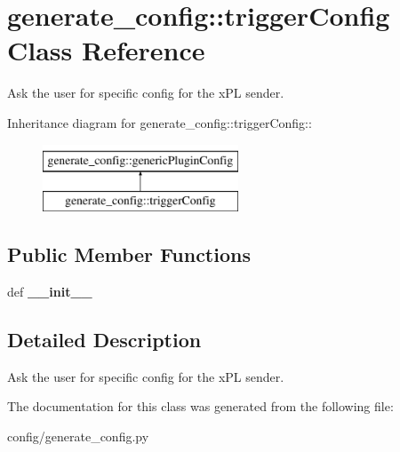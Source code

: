 \hypertarget{classgenerate__config_1_1triggerConfig}{
\section{generate\_\-config::triggerConfig Class Reference}
\label{classgenerate__config_1_1triggerConfig}
}
Ask the user for specific config for the xPL sender.  


Inheritance diagram for generate\_\-config::triggerConfig::\begin{figure}[H]
\begin{center}
\leavevmode
\includegraphics[height=2cm]{classgenerate__config_1_1triggerConfig}
\end{center}
\end{figure}
\subsection*{Public Member Functions}
\begin{CompactItemize}
\item 
\hypertarget{classgenerate__config_1_1triggerConfig_40e2f872feeb29963472a73ca7937dfd}{
def \textbf{\_\-\_\-init\_\-\_\-}}
\label{classgenerate__config_1_1triggerConfig_40e2f872feeb29963472a73ca7937dfd}

\end{CompactItemize}


\subsection{Detailed Description}
Ask the user for specific config for the xPL sender. 

The documentation for this class was generated from the following file:\begin{CompactItemize}
\item 
config/generate\_\-config.py\end{CompactItemize}

